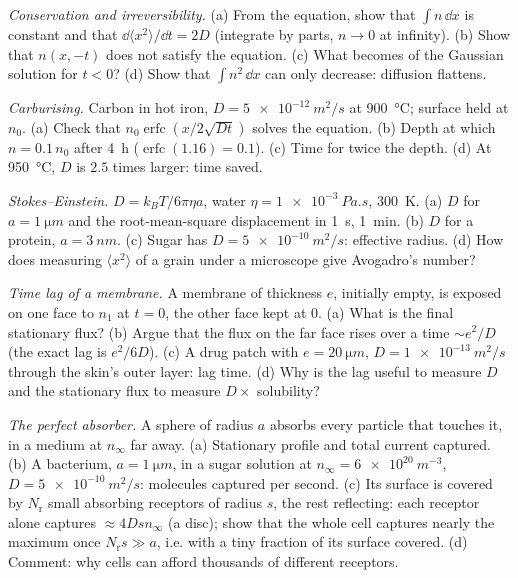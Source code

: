 \begin{exercise}[$\star\star$]\label{exo:b2:particle-diffusion:7}
\emph{Conservation and irreversibility.} (a) From the equation, show
that $\int n\,\dd x$ is constant and that $\dd\langle x^2\rangle/\dd t =
2D$ (integrate by parts, $n \to 0$ at infinity). (b) Show that
$n(x,-t)$ does not satisfy the equation. (c) What becomes of the
Gaussian solution for $t < 0$? (d) Show that $\int n^2\,\dd x$ can only
decrease: diffusion flattens.
\end{exercise}

\begin{exercise}[$\star\star$]\label{exo:b2:particle-diffusion:8}
\emph{Carburising.} Carbon in hot iron, $D = \qty{5e-12}{m^2/s}$ at
\qty{900}{\celsius}; surface held at $n_0$. (a) Check that $n_0
\operatorname{erfc}(x/2\sqrt{Dt})$ solves the equation. (b) Depth at
which $n = 0.1\,n_0$ after \qty{4}{h} ($\operatorname{erfc}(1.16) = 0.1$).
(c) Time for twice the depth. (d) At \qty{950}{\celsius}, $D$ is $2.5$
times larger: time saved.
\end{exercise}

\begin{exercise}[$\star\star$]\label{exo:b2:particle-diffusion:9}
\emph{Stokes--Einstein.} $D = k_BT/6\pi\eta a$, water $\eta =
\qty{1e-3}{Pa.s}$, \qty{300}{K}. (a) $D$ for $a = \qty{1}{\micro m}$ and
the root-mean-square displacement in \qty{1}{s}, \qty{1}{min}. (b) $D$
for a protein, $a = \qty{3}{nm}$. (c) Sugar has $D = \qty{5e-10}{m^2/s}$:
effective radius. (d) How does measuring $\langle x^2\rangle$ of a grain
under a microscope give Avogadro's number?
\end{exercise}

\begin{exercise}[$\star\star\star$]\label{exo:b2:particle-diffusion:10}
\emph{Time lag of a membrane.} A membrane of thickness $e$, initially
empty, is exposed on one face to $n_1$ at $t = 0$, the other face kept
at $0$. (a) What is the final stationary flux? (b) Argue that the flux
on the far face rises over a time $\sim e^2/D$ (the exact lag is
$e^2/6D$). (c) A drug patch with $e = \qty{20}{\micro m}$, $D =
\qty{1e-13}{m^2/s}$ through the skin's outer layer: lag time. (d) Why
is the lag useful to measure $D$ and the stationary flux to measure
$D \times$ solubility?
\end{exercise}

\begin{exercise}[$\star\star\star$]\label{exo:b2:particle-diffusion:11}
\emph{The perfect absorber.} A sphere of radius $a$ absorbs every
particle that touches it, in a medium at $n_\infty$ far away. (a)
Stationary profile and total current captured. (b) A bacterium, $a =
\qty{1}{\micro m}$, in a sugar solution at $n_\infty = \qty{6e20}{m^{-3}}$,
$D = \qty{5e-10}{m^2/s}$: molecules captured per second. (c) Its
surface is covered by $N_{\text{r}}$ small absorbing receptors of
radius $s$, the rest reflecting: each receptor alone captures $\approx
4Ds n_\infty$ (a disc); show that the whole cell captures nearly the
maximum once $N_{\text{r}} s \gg a$, i.e. with a tiny fraction of its
surface covered. (d) Comment: why cells can afford thousands of
different receptors.
\end{exercise}

